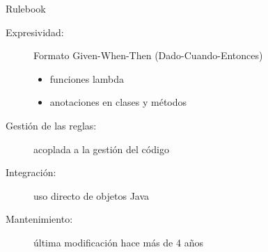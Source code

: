 \documentclass[10pt]{beamer}
\begin{document}
\begin{frame}{Rulebook}
    \begin{description}
        \item [Expresividad:] Formato Given-When-Then (Dado-Cuando-Entonces)
            \begin{itemize}
                \item funciones lambda
                \item anotaciones en clases y métodos
            \end{itemize}
        \item [Gestión de las reglas:] acoplada a la gestión del código
        \item [Integración:] uso directo de objetos Java
        \item [Mantenimiento:] última modificación hace más de 4 años
    \end{description}
\end{frame}

\end{document}
